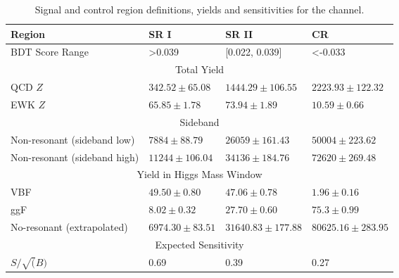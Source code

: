 \begin{table}[]
\centering
\caption{Signal and control region definitions, yields and sensitivities for the \fourcentral channel. }
\label{tab:BDTReg4cen}
\begin{tabular}{|l|l|l|l|}
\hline
Region              & SR I       & SR II     & CR    \\ \hline
\hline
BDT Score Range &  >0.039 & [0.022, 0.039]   & <-0.033 \\ \hline

\multicolumn{4}{|c|}{Total Yield}                                                        \\ \hline
QCD $Z$  & $342.52 \pm 65.08$   &  $1444.29 \pm 106.55$  & $2223.93 \pm 122.32$     \\ \cline{2-4} 
EWK $Z$  & $65.85 \pm 1.78$   &  $73.94 \pm 1.89$ &    $10.59 \pm 0.66$  \\ \hline

\multicolumn{4}{|c|}{Sideband}  \\ \hline
Non-resonant (sideband low)   & $ 7884 \pm 88.79$  & $26059 \pm 161.43 $ & $50004 \pm 223.62  $    \\ \cline{2-4} 
Non-resonant (sideband high)  & $ 11244 \pm 106.04$  & $34136 \pm 184.76 $ & $72620 \pm 269.48 $   \\ \hline

\multicolumn{4}{|c|}{Yield in Higgs Mass Window} \\
\hline
VBF                     & $49.50\pm 0.80$                  & $ 47.06\pm 0.78$                 & $1.96 \pm 0.16$                    \\ \hline
ggF                     & $8.02 \pm 0.32$                  & $27.70 \pm 0.60$                 & $75.3 \pm 0.99$                    \\ \hline
No-resonant (extrapolated) & $6974.30 \pm 83.51$                & $31640.83 \pm 177.88$               &  $80625.16 \pm 283.95$                  \\ \hline
\hline 
\multicolumn{4}{|c|}{Expected Sensitivity} \\
\hline
$S/ \sqrt(B)$           & 0.69                  & 0.39                  & 0.27                    \\ \hline
\end{tabular}
\end{table}
